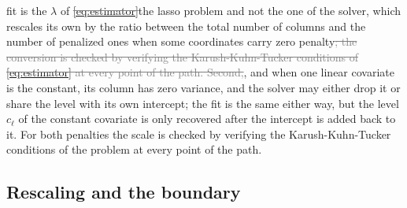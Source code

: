\documentclass[12pt]{article} %
\theoremstyle{definition}
\theoremstyle{plain}
\newcommand{\cv}{\ell}
\newcommand{\lvl}[1]{c_{#1}}
\newcommand{\pen}{\lambda}
\begin{document}
fit is the $\pen$ of \textcolor{gray}{\sout{\mbox{\eqref{eq:estimator}}}}\textcolor{colR1}{the lasso problem} and not the one of the solver, which
rescales its own by the ratio between the total number of columns and the
number of penalized ones when some coordinates carry zero penalty\textcolor{gray}{\sout{; the
conversion is checked by verifying the Karush-Kuhn-Tucker conditions of
\mbox{\eqref{eq:estimator}} at every point of the path. Second,}}\textcolor{colR1}{, and} when one linear
covariate is the constant, its column has zero variance, and the solver may
either drop it or share the level with its own intercept; the fit is the same
either way, but the level $\lvl{\cv}$ of the constant covariate is only
recovered after the intercept is added back to it. \textcolor{colR1}{For both
penalties the scale is checked by verifying the Karush-Kuhn-Tucker conditions
of the problem at every point of the path.}

\subsection{Rescaling and the boundary}
\label{sec:boundary}
\end{document}
